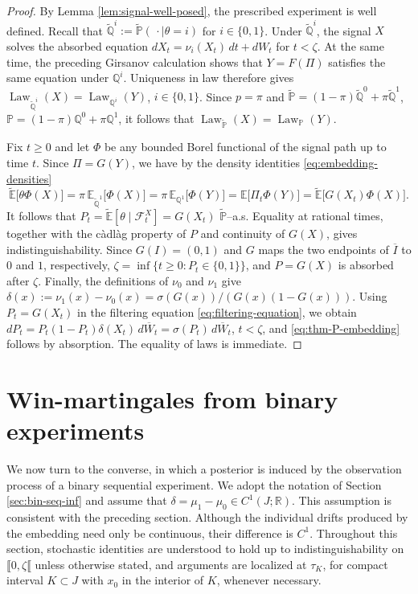 \documentclass[11pt, reqno]{amsart}
\theoremstyle{plain}
\theoremstyle{remark}
\numberwithin{equation}{section}
\begin{document}
\begin{proof}
By Lemma \ref{lem:signal-well-posed}, the prescribed experiment is
well defined. Recall that $\widetilde{\mathbb Q}^i:=\widetilde{\mathbb P}(\,\cdot\mid\theta=i)$ for $i\in\{0,1\}$. Under $\widetilde{\mathbb Q}^i$, the signal $X$ solves the absorbed equation $dX_t=\nu_i(X_t)\,dt+dW_t$ for $t<\zeta$.
At the same time, the preceding Girsanov calculation shows that $Y=F(\Pi)$ satisfies
the same equation under $\mathbb Q^i$. Uniqueness in law therefore gives $\operatorname{Law}_{\widetilde{\mathbb Q}^i}(X)=\operatorname{Law}_{\mathbb Q^i}(Y)$, $i\in\{0,1\}$. Since $p=\pi$ and $\widetilde{\mathbb P}
  =
  (1-\pi)\widetilde{\mathbb Q}^0
  +
  \pi\widetilde{\mathbb Q}^1$, $\mathbb P
  =
  (1-\pi)\mathbb Q^0+\pi\mathbb Q^1$,
it follows that $\operatorname{Law}_{\widetilde{\mathbb P}}(X)=\operatorname{Law}_{\mathbb P}(Y)$.

Fix $t\geq0$ and let $\Phi$ be any bounded Borel functional of the signal path up to time $t$. Since $\Pi=G(Y)$, we have by the density
identities \eqref{eq:embedding-densities}
\[
  \widetilde{\mathbb E}\bigl[\theta\Phi(X)\bigr]
  =
  \pi\,
  \mathbb E_{\widetilde{\mathbb Q}^1}\bigl[\Phi(X)\bigr] =
  \pi\,
  \mathbb E_{\mathbb Q^1}\bigl[\Phi(Y)\bigr] =
  \mathbb E\bigl[\Pi_t\Phi(Y)\bigr] =
  \widetilde{\mathbb E}
  \bigl[G(X_t)\Phi(X)\bigr].
\]
It follows that $P_t= \widetilde{\mathbb E}[\theta\mid\mathcal F_t^X]=G(X_t)$ $\widetilde{\mathbb P}$--a.s.
Equality at rational times, together with the c\`adl\`ag property of
$P$ and continuity of $G(X)$, gives indistinguishability. Since $G(I)=(0,1)$ and $G$ maps the two endpoints of $\overline I$
to $0$ and $1$, respectively, $\zeta
  =
  \inf\{t\geq0:P_t\in\{0,1\}\}$,
and $P=G(X)$ is absorbed after $\zeta$. Finally, the definitions of $\nu_0$ and $\nu_1$ give $\delta(x):=
  \nu_1(x)-\nu_0(x) 
  =
  \sigma(G(x))/(G(x)(1-G(x)))$.
Using $P_t=G(X_t)$ in the filtering equation
\eqref{eq:filtering-equation}, we obtain $dP_t
  =
  P_t(1-P_t)\delta(X_t)\,d\overline W_t=
  \sigma(P_t)\,d\overline W_t$, $t<\zeta$,
and \eqref{eq:thm-P-embedding} follows by absorption. The equality of laws is immediate.
\end{proof}


\section{Win-martingales from binary experiments}\label{sec:converse}
We now turn to the converse, in which a posterior is induced by the observation process of a binary sequential experiment. We adopt the notation of Section \ref{sec:bin-seq-inf} and assume that $\delta=\mu_1-\mu_0\in C^1(J;\mathbb R)$. This assumption is consistent with the preceding section. Although the individual drifts produced by the embedding need only be continuous, their difference is $C^1$. Throughout this section, stochastic identities are understood to hold up to indistinguishability on $\llbracket 0,\zeta\llbracket$ unless otherwise stated, and arguments are localized at $\tau_K$, for compact interval $K\subset J$ with $x_0$ in the interior of $K$, whenever necessary. 
\end{document}
